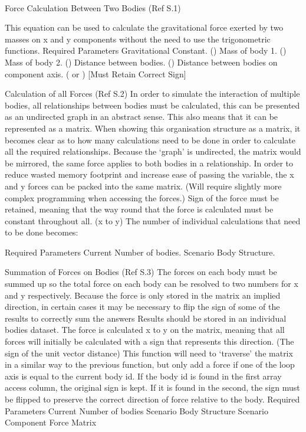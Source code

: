 \paragraph{}
Force Calculation Between Two Bodies (Ref S.1)
 
This equation can be used to calculate the gravitational force exerted by two masses on x and y components without the need to use the trigonometric functions.
Required Parameters
Gravitational Constant. ()
Mass of body 1. ()
Mass of body 2. ()
Distance between bodies. ()
Distance between bodies on component axis. ( or ) [Must Retain Correct Sign]

Calculation of all Forces (Ref S.2)
In order to simulate the interaction of multiple bodies, all relationships between bodies must be calculated, this can be presented as an undirected graph in an abstract sense. This also means that it can be represented as a matrix. 
When showing this organisation structure as a matrix, it becomes clear as to how many calculations need to be done in order to calculate all the required relationships.
Because the ‘graph’ is undirected, the matrix would be mirrored, the same force applies to both bodies in a relationship.
In order to reduce wasted memory footprint and increase ease of passing the variable, the x and y forces can be packed into the same matrix. (Will require slightly more complex programming when accessing the forces.)
Sign of the force must be retained, meaning that the way round that the force is calculated must be constant throughout all. (x to y)
The number of individual calculations that need to be done becomes:

Required Parameters
Current Number of bodies.
Scenario Body Structure.

Summation of Forces on Bodies (Ref S.3)
The forces on each body must be summed up so the total force on each body can be resolved to two numbers for x and y respectively.
Because the force is only stored in the matrix an implied direction, in certain cases it may be necessary to flip the sign of some of the results to correctly sum the answers
Results should be stored in an individual bodies dataset.
The force is calculated x to y on the matrix, meaning that all forces will initially be calculated with a sign that represents this direction. (The sign of the unit vector distance)
This function will need to ‘traverse’ the matrix in a similar way to the previous function, but only add a force if one of the loop axis is equal to the current body id.
If the body id is found in the first array access column, the original sign is kept. If it is found in the second, the sign must be flipped to preserve the correct direction of force relative to the body.
Required Parameters
Current Number of bodies
Scenario Body Structure
Scenario Component Force Matrix

